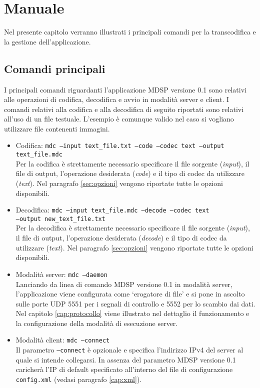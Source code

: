 \chapter{Manuale}
Nel presente capitolo verranno illustrati i principali comandi per la
transcodifica e la gestione dell'applicazione.

\section{Comandi principali}
I principali comandi riguardanti l'applicazione MDSP versione 0.1 sono relativi
alle operazioni di codifica, decodifica e avvio in modalità server e client. I
comandi relativi alla codifica e alla decodifica di seguito riportati sono
relativi all'uso di un file testuale. L'esempio è comunque valido nel caso si
vogliano utilizzare file contenenti immagini.

\begin{itemize}
  \item Codifica: \texttt{mdc --input text\_file.txt --code --codec text
  --output text\_file.mdc}\\ Per la codifica è strettamente necessario
  specificare il file sorgente (\emph{input}), il file di output, l'operazione desiderata (\emph{code}) e il
tipo di codec da utilizzare (\emph{text}). Nel paragrafo \ref{sec:opzioni} vengono riportate tutte le opzioni disponibili. 
  \item Decodifica: \texttt{mdc --input text\_file.mdc --decode --codec
  text\\ --output new\_text\_file.txt}\\ Per la decodifica è strettamente
  necessario specificare il file sorgente (\emph{input}), il file di output, l'operazione desiderata (\emph{decode}) e il
tipo di codec da utilizzare (\emph{text}). Nel paragrafo \ref{sec:opzioni} vengono riportate tutte le opzioni disponibili.
  \item Modalità server: \texttt{mdc --daemon}\\ Lanciando da linea di comando
  MDSP versione 0.1 in modalità server, l'applicazione viene configurata come `erogatore di file' e si pone in ascolto
sulle porte UDP 5551 per i segnali di controllo e 5552 per lo scambio dai dati. Nel capitolo \ref{cap:protocollo} viene illustrato nel dettaglio il
funzionamento e la configurazione della modalità di esecuzione server.
  \item Modalità client: \texttt{mdc --connect}\\ Il parametro
  \texttt{--connect} è opzionale e specifica l'indirizzo IPv4 del server al
  quale si intende collegarsi. In assenza del parametro MDSP versione 0.1
  caricherà l'IP di default specificato all'interno del file di configurazione
  \texttt{config.xml} (vedasi paragrafo \ref{cap:xml}).
\end{itemize}

